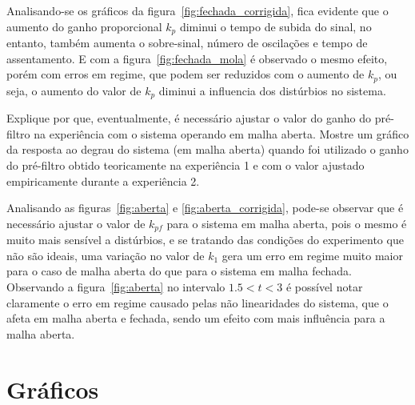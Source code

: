 \documentclass{ZenTera}
\begin{document}
\begin{questions}
    \begin{solution}
    Analisando-se os gráficos da figura~\ref{fig:fechada_corrigida}, fica evidente que o aumento do ganho proporcional $k_p$ diminui o tempo de subida do sinal, no entanto, também aumenta o sobre-sinal, número de oscilações e tempo de assentamento. E com a figura~\ref{fig:fechada_mola} é observado o mesmo efeito, porém com erros em regime, que podem ser reduzidos com o aumento de $k_p$, ou seja, o aumento do valor de $k_p$ diminui a influencia dos distúrbios no sistema. 
    \end{solution}
    
\question Explique por que, eventualmente, é necessário ajustar o valor do ganho do pré-filtro na experiência com o sistema operando em malha aberta. 
Mostre um gráfico da resposta ao degrau do sistema (em malha aberta) quando foi utilizado o ganho do pré-filtro obtido teoricamente na experiência 1 e com o valor ajustado empiricamente durante a experiência 2.

    \begin{solution}
    Analisando as figuras~\ref{fig:aberta} e \ref{fig:aberta_corrigida}, pode-se observar que é necessário ajustar o valor de $k_{pf}$ para o sistema em malha aberta, pois o mesmo é muito mais sensível a distúrbios, e se tratando das condições do experimento que não são ideais, uma variação no valor de $k_1$ gera um erro em regime muito maior para o caso de malha aberta do que para o sistema em malha fechada.
    Observando a figura~\ref{fig:aberta} no intervalo $1.5<t<3$ é possível notar claramente o erro em regime causado pelas não linearidades do sistema, que o afeta em malha aberta e fechada, sendo um efeito com mais influência para a malha aberta. 
    
    
    
    \end{solution}

\end{questions}

\appendix

\section{Gráficos}

\end{document}
